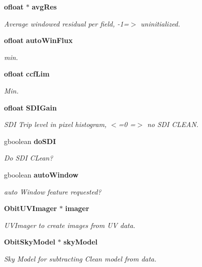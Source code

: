 \begin{CompactItemize}
{\bf ofloat} $\ast$ {\bf avg\-Res}
\begin{CompactList}\small\item\em Average windowed residual per field, -1=$>$ uninitialized. \item\end{CompactList}\item 
{\bf ofloat} {\bf auto\-Win\-Flux}
\begin{CompactList}\small\item\em min. \item\end{CompactList}\item 
{\bf ofloat} {\bf ccf\-Lim}
\begin{CompactList}\small\item\em Min. \item\end{CompactList}\item 
{\bf ofloat} {\bf SDIGain}
\begin{CompactList}\small\item\em SDI Trip level in pixel histogram, $<$=0 =$>$ no SDI CLEAN. \item\end{CompactList}\item 
gboolean {\bf do\-SDI}
\begin{CompactList}\small\item\em Do SDI CLean? \item\end{CompactList}\item 
gboolean {\bf auto\-Window}
\begin{CompactList}\small\item\em auto Window feature requested? \item\end{CompactList}\item 
{\bf Obit\-UVImager} $\ast$ {\bf imager}
\begin{CompactList}\small\item\em UVImager to create images from UV data. \item\end{CompactList}\item 
{\bf Obit\-Sky\-Model} $\ast$ {\bf sky\-Model}
\begin{CompactList}\small\item\em Sky Model for subtracting Clean model from data. \item\end{CompactList}\item 

\end{CompactItemize}
